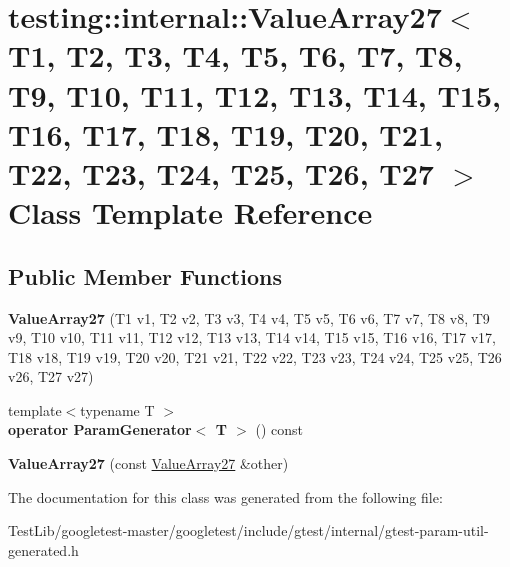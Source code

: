 \hypertarget{classtesting_1_1internal_1_1ValueArray27}{}\section{testing\+:\+:internal\+:\+:Value\+Array27$<$ T1, T2, T3, T4, T5, T6, T7, T8, T9, T10, T11, T12, T13, T14, T15, T16, T17, T18, T19, T20, T21, T22, T23, T24, T25, T26, T27 $>$ Class Template Reference}
\label{classtesting_1_1internal_1_1ValueArray27}
\subsection*{Public Member Functions}
\begin{DoxyCompactItemize}
\item 
\mbox{\label{classtesting_1_1internal_1_1ValueArray27_a17b34a604c556eef28039dc4c5d0343f}} 
{\bfseries Value\+Array27} (T1 v1, T2 v2, T3 v3, T4 v4, T5 v5, T6 v6, T7 v7, T8 v8, T9 v9, T10 v10, T11 v11, T12 v12, T13 v13, T14 v14, T15 v15, T16 v16, T17 v17, T18 v18, T19 v19, T20 v20, T21 v21, T22 v22, T23 v23, T24 v24, T25 v25, T26 v26, T27 v27)
\item 
\mbox{\label{classtesting_1_1internal_1_1ValueArray27_af120f76a65da981182ecfaa8846a10bd}} 
{\footnotesize template$<$typename T $>$ }\\{\bfseries operator Param\+Generator$<$ T $>$} () const
\item 
\mbox{\label{classtesting_1_1internal_1_1ValueArray27_a84702665e9f3180487c8061b2981202d}} 
{\bfseries Value\+Array27} (const \hyperlink{classtesting_1_1internal_1_1ValueArray27}{Value\+Array27} \&other)
\end{DoxyCompactItemize}


The documentation for this class was generated from the following file\+:\begin{DoxyCompactItemize}
\item 
Test\+Lib/googletest-\/master/googletest/include/gtest/internal/gtest-\/param-\/util-\/generated.\+h\end{DoxyCompactItemize}
